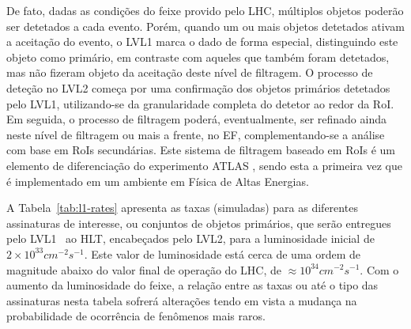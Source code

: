 De fato, dadas as condições do feixe provido pelo LHC, múltiplos objetos
poderão ser detetados a cada evento. Porém, quando um ou mais objetos
detetados ativam a aceitação do evento, o LVL1 marca o dado de forma especial,
distinguindo este objeto como primário, em contraste com aqueles que também
foram detetados, mas não fizeram objeto da aceitação deste nível de
filtragem. O processo de deteção no LVL2 começa por uma confirmação dos
objetos primários detetados pelo LVL1, utilizando-se da granularidade
completa do detetor ao redor da RoI. Em seguida, o processo de filtragem
poderá, eventualmente, ser refinado ainda neste nível de filtragem ou mais a
frente, no EF, complementando-se a análise com base em RoIs secundárias. Este
sistema de filtragem  baseado em RoIs é um elemento de
diferenciação do experimento ATLAS \cite{atlas-tp}, sendo esta a primeira vez
que é implementado em um ambiente em Física de Altas Energias.

A Tabela~\ref{tab:l1-rates} apresenta as taxas (simuladas) para as diferentes
assinaturas de interesse, ou conjuntos de objetos primários, que serão
entregues pelo LVL1~\cite{hlt-tdr} ao HLT, encabeçados pelo LVL2, para a
luminosidade inicial de $2\times10^{33}cm^{-2}s^{-1}$. Este valor de
luminosidade está cerca de uma ordem de magnitude abaixo do valor final de
operação do LHC, de $\approx 10^{34}cm^{-2}s^{-1}$. Com o aumento da
luminosidade do feixe, a relação entre as taxas ou até o tipo das assinaturas
nesta tabela sofrerá alterações tendo em vista a mudança na probabilidade de
ocorrência de fenômenos mais raros.

